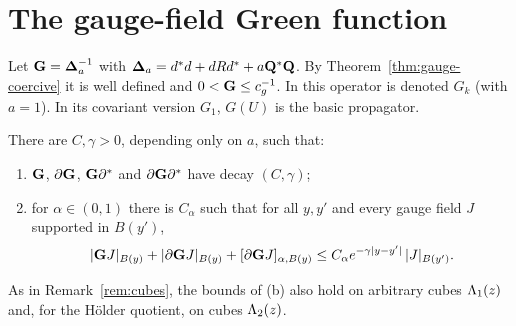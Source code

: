 \section{The gauge-field Green function}\label{sec:gauge-green}

Let $\mathbf G=\boldsymbol{\Delta}_a^{-1}$ with $\boldsymbol{\Delta}_a=d^*d+dRd^*+a\mathbf Q^*\mathbf Q$. By Theorem~\ref{thm:gauge-coercive} it is well defined and $0<\mathbf G\le c_g^{-1}$. In \cite{BalPropI} this operator is denoted $G_k$ (with $a=1$). In \cite{BalBackground,BalVar} its covariant version $G_1$, $G(U)$ is the basic propagator.

\begin{theorem}\label{thm:gauge-green}
There are $C,\gamma>0$, depending only on $a$, such that:
\begin{enumerate}[label=(\alph*)]
\item $\mathbf G$, $\partial\mathbf G$, $\mathbf G\partial^*$ and $\partial\mathbf G\partial^*$ have decay $(C,\gamma)$;
\item for $\alpha\in(0,1)$ there is $C_\alpha$ such that for all $y,y'$ and every gauge field $J$ supported in $B(y')$,
\[
|\mathbf G J|_{B(y)}+|\partial\mathbf G J|_{B(y)}+[\partial\mathbf G J]_{\alpha,B(y)}\le C_\alpha e^{-\gamma|y-y'|}\,|J|_{B(y')} .
\]
\end{enumerate}
As in Remark~\ref{rem:cubes}, the bounds of (b) also hold on arbitrary cubes $\Lambda_1(z)$ and, for the H\"older quotient, on cubes $\Lambda_2(z)$.
\end{theorem}

